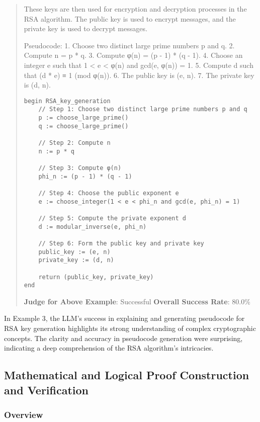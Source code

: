 \documentclass[fleqn,10pt]{wlscirep}
\begin{document}
\begin{quote}
These keys are then used for encryption and decryption processes in the
RSA algorithm. The public key is used to encrypt messages, and the
private key is used to decrypt messages.

Pseudocode: 1. Choose two distinct large prime numbers p and q. 2.
Compute n = p * q. 3. Compute φ(n) = (p - 1) * (q - 1). 4. Choose an
integer e such that 1 \textless{} e \textless{} φ(n) and gcd(e, φ(n)) =
1. 5. Compute d such that (d * e) ≡ 1 (mod φ(n)). 6. The public key is
(e, n). 7. The private key is (d, n).

\begin{verbatim}
begin RSA_key_generation
    // Step 1: Choose two distinct large prime numbers p and q
    p := choose_large_prime()
    q := choose_large_prime()
    
    // Step 2: Compute n
    n := p * q
    
    // Step 3: Compute φ(n)
    phi_n := (p - 1) * (q - 1)
    
    // Step 4: Choose the public exponent e
    e := choose_integer(1 < e < phi_n and gcd(e, phi_n) = 1)
    
    // Step 5: Compute the private exponent d
    d := modular_inverse(e, phi_n)
    
    // Step 6: Form the public key and private key
    public_key := (e, n)
    private_key := (d, n)
    
    return (public_key, private_key)
end
\end{verbatim}

\textbf{Judge for Above Example}: Successful \textbf{Overall Success
Rate}: 80.0\%
\end{quote}

In Example 3, the LLM's success in explaining and generating pseudocode
for RSA key generation highlights its strong understanding of complex
cryptographic concepts. The clarity and accuracy in pseudocode
generation were surprising, indicating a deep comprehension of the RSA
algorithm's intricacies.

\hypertarget{mathematical-and-logical-proof-construction-and-verification}{%
\subsection{Mathematical and Logical Proof Construction and
Verification}\label{mathematical-and-logical-proof-construction-and-verification}}

\hypertarget{overview-14}{%
\subsubsection{Overview}\label{overview-14}}
\end{document}
